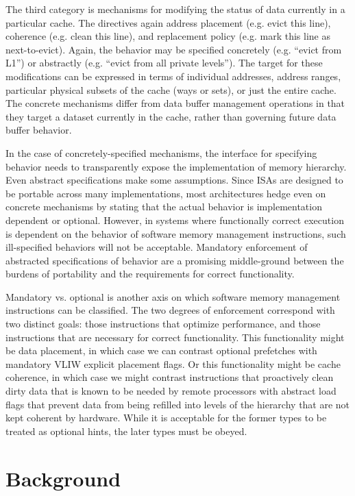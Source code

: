 The third category is mechanisms for modifying the status of data currently in a particular cache. The directives again address placement (e.g. evict this line), coherence (e.g. clean this line), and replacement policy (e.g. mark this line as next-to-evict). Again, the behavior may be specified concretely (e.g. ``evict from L1'') or abstractly (e.g. ``evict from all private levels''). The target for these modifications can be expressed in terms of individual addresses, address ranges, particular physical subsets of the cache (ways or sets), or just the entire cache.  The concrete mechanisms differ from data buffer management operations in that they target a dataset currently in the cache, rather than governing future data buffer behavior.

In the case of concretely-specified mechanisms, the interface for specifying behavior needs to transparently expose the implementation of memory hierarchy. Even abstract specifications make some assumptions. Since ISAs are designed to be portable across many implementations, most architectures hedge even on concrete mechanisms by stating that the actual behavior is implementation dependent or optional. However, in systems where functionally correct execution is dependent on the behavior of software memory management instructions, such ill-specified behaviors will not be acceptable. Mandatory enforcement of abstracted specifications of behavior are a promising middle-ground between the burdens of portability and the requirements for correct functionality. 

Mandatory vs. optional is another axis on which software memory management instructions can be classified. The two degrees of enforcement correspond with two distinct goals: those instructions that optimize performance, and those instructions that are necessary for correct functionality.
This functionality might be data placement, in which case we can contrast optional prefetches with mandatory VLIW explicit placement flags. Or this functionality might be cache coherence, in which case we might contrast instructions that proactively clean dirty data that is known to be needed by remote processors with abstract load flags that prevent data from being refilled into levels of the hierarchy that are not kept coherent by hardware. While it is acceptable for the former types to be treated as optional hints, the later types must be obeyed.

\section{Background}

